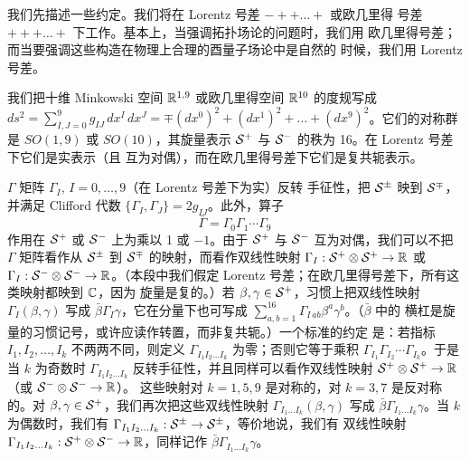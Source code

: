   
  
  

  

\par{}

 

 我们先描述一些约定。我们将在 Lorentz 号差 $-++\dots +$ 或欧几里得
号差 $+++\dots +$ 下工作。基本上，当强调拓扑场论的问题时，我们用
欧几里得号差；而当要强调这些构造在物理上合理的酉量子场论中是自然的
时候，我们用 Lorentz 号差。

 我们把十维 Minkowski 空间 $\Bbb{R}^{1,9}$ 或欧几里得空间
$\Bbb{R}^{10}$ 的度规写成
$ds^2=\sum_{I,J=0}^9g_{IJ}\,dx^I\,dx^J=\mp (dx^0)^2+(dx^1)^2+\dots
+(dx^9)^2$。它们的对称群是 $SO(1,9)$ 或 $SO(10)$，其旋量表示
${\EUS}^+$ 与 ${\EUS}^-$ 的秩为 16。在 Lorentz 号差下它们是实表示（且
互为对偶），而在欧几里得号差下它们是复共轭表示。

 $\Gamma$ 矩阵 $\Gamma_I,\,I=0,\dots,9$（在 Lorentz 号差下为实）反转
手征性，把 ${\EUS}^\pm$ 映到 ${\EUS}^\mp$，并满足 Clifford 代数
$\{\Gamma_I,\Gamma_J\}=2g_{IJ}$。此外，算子
\setcounter{equation}{0}
\begin{equation}\label{eq:thop}
\bar\Gamma=\Gamma_0\Gamma_1\cdots\Gamma_9
\end{equation}
 作用在
${\EUS}^+$ 或 ${\EUS}^-$ 上为乘以 1 或 $-1$。由于
${\EUS}^+$ 与 ${\EUS}^-$ 互为对偶，我们可以不把 $\Gamma$ 矩阵看作从
${\EUS}^\pm$ 到 ${\EUS}^{\mp}$ 的映射，而看作双线性映射
$\Gamma_I:{\EUS}^+\otimes {\EUS}^+\to \Bbb{R}$ 或
$\Gamma_I:{\EUS}^-\otimes{\EUS}^-\to \Bbb{R}$。（本段中我们假定
Lorentz 号差；在欧几里得号差下，所有这类映射都映到 $\Bbb{C}$，因为
旋量是复的。）若 $\beta,\gamma\in {\EUS}^+$，习惯上把双线性映射
$\Gamma_I(\beta,\gamma)$ 写成 $\bar\beta
\Gamma_I\gamma$，它在分量下也可写成
$\sum_{a,b=1}^{16}\Gamma_{I\,ab}\beta^a\gamma^b$。（$\bar \beta$ 中的
横杠是旋量的习惯记号，或许应读作转置，而非复共轭。）一个标准的约定
是：若指标 $I_1,I_2,\dots,I_k$ 不两两不同，则定义
$\Gamma_{I_1I_2\dots I_k}$ 为零；否则它等于乘积
$\Gamma_{I_1}\Gamma_{I_2}\cdots \Gamma_{I_k}$。于是当 $k$ 为奇数时
$\Gamma_{I_1I_2\dots I_k}$ 反转手征性，并且同样可以看作双线性映射
${\EUS}^+\otimes {\EUS}^+\to \Bbb{R}$（或 ${\EUS}^-\otimes {\EUS}^-\to \Bbb{R}$）。
这些映射对 $k=1,5,9$ 是对称的，对 $k=3,7$ 是反对称的。对
$\beta,\gamma\in {\EUS}^+$，我们再次把这些双线性映射
$\Gamma_{I_1\dots I_k}(\beta,\gamma)$ 写成
$\bar\beta\Gamma_{I_1\dots I_k}\gamma$。当 $k$ 为偶数时，我们有
$\Gamma_{I_1I_2\dots I_k}:{\EUS}^\pm\to{\EUS}^\pm$，等价地说，我们有
双线性映射 $\Gamma_{I_1I_2\dots
I_k}:{\EUS}^+\otimes {\EUS}^-\to \Bbb{R}$，同样记作
$\bar\beta\Gamma_{I_1\dots I_k}\gamma$。

